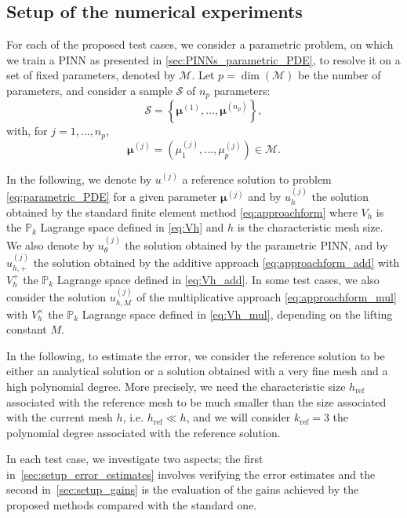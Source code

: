 \subsection{Setup of the numerical experiments}\label{sec:setup}

For each of the proposed test cases,
we consider a parametric problem, on which we train a PINN as presented in \cref{sec:PINNs_parametric_PDE},
to resolve it on a set of fixed parameters, denoted by $\mathcal{M}$.
Let $p=\dim(\mathcal{M})$ be the number of parameters,
and consider a sample $\mathcal{S}$ of $n_p$ parameters:
\begin{equation*}
	\mathcal{S}=\left\{\bm{\mu}^{(1)},\dots,\bm{\mu}^{(n_p)}\right\},
\end{equation*}
with, for $j=1,\dots,n_p$,
\begin{equation*}
	\bm{\mu}^{(j)}=\left(\mu_1^{(j)},\dots,\mu_{p}^{(j)}\right)\in \mathcal{M}.
\end{equation*}

In the following, we denote by $u^{(j)}$ a reference solution to problem \eqref{eq:parametric_PDE} for a given parameter $\bm{\mu}^{(j)}$ and by $u_h^{(j)}$ the solution obtained by the standard finite element method \eqref{eq:approachform} where $V_h$ is the $\mathbb{P}_k$ Lagrange space defined in \eqref{eq:Vh} and $h$ is the characteristic mesh size. We also denote by $u_\theta^{(j)}$ the solution obtained by the parametric PINN, and by $u_{h,+}^{(j)}$ the solution obtained by the additive approach \eqref{eq:approachform_add} with $V_h^+$ the $\mathbb{P}_k$ Lagrange space defined in \eqref{eq:Vh_add}. In some test cases, we also consider the solution  $u_{h, M}^{(j)}$ of the multiplicative approach \eqref{eq:approachform_mul} with $V_h^\times$ the $\mathbb{P}_k$ Lagrange space defined in \eqref{eq:Vh_mul}, depending on the lifting constant $M$.

\begin{remark}\label{rk:ref}
	In the following, to estimate the error, we consider the reference solution to be either an analytical solution or a solution obtained with a very fine mesh and a high polynomial degree. More precisely, we need the characteristic size $h_\text{ref}$ associated with the reference mesh to be much smaller than the size associated with the current mesh $h$, i.e. $h_\text{ref}\ll h$, and we will consider $k_\text{ref}=3$ the polynomial degree associated with the reference solution.
\end{remark}

In each test case, we investigate two aspects; the first in~\cref{sec:setup_error_estimates} involves verifying the error estimates and the second in~\cref{sec:setup_gains} is the evaluation of the gains achieved by the proposed methods compared with the standard one.

